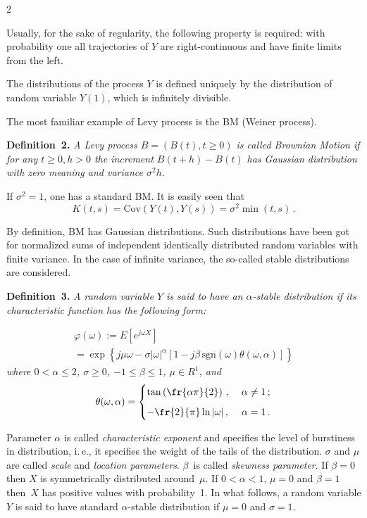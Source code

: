 \begin{multicols}{2}
\smallskip

Usually, for the sake of regularity,  the following property is required: with 
probability one all trajectories of $Y$ are right-continuous and have finite limits 
from the left. 

The distributions of the process $Y$ is defined uniquely by the distribution of 
random variable $Y(1)$, which is infinitely divisible. 

The most familiar example of Levy process is the BM (Weiner process). 

\smallskip

\noindent
\textbf{Definition~2.} 
\textit{A Levy process $B = (B(t), t\geq 0)$ is called Brownian Motion if for any 
$t\geq 0, h>0$ the increment 
$B(t+h) -B(t)$ has Gaussian distribution with zero meaning and variance $\sigma^2 h$}. 

\smallskip

If $\sigma^2 =1$,  one has a standard BM. It is easily seen that 
$$
K(t,s) = \mbox{Cov} \left(Y(t), Y(s)\right) = \sigma^2 \min (t,s) \, . 
$$

By definition, BM has Gaussian distributions. Such distributions have been got for normalized 
sums of independent identically distributed random variables with finite variance. 
In the case of 
infinite variance,  the so-called stable distributions are considered. 

\smallskip

\noindent
\textbf{Definition~3.} 
\textit{A random variable $Y$ is said to have an $\alpha$-stable distribution if its 
characteristic function has the following form:} 

\noindent
\begin{multline*}
\varphi (\omega ) := E\left[ e^{j\omega X} \right] \\
{}=
\exp \left\{ j\mu\omega - \sigma |\omega |^{\alpha} [1 - j \beta\, \mbox{sgn}\left(\omega \right) 
\theta (\omega , \alpha )] \right\}  
\end{multline*}
\textit{where $0< \alpha \leq 2$, $\sigma\geq 0$, $-1 \leq \beta \leq 1$, $\mu\in R^1$, and} 
$$
\theta (\omega , \alpha ) = 
\begin{cases}
\tan \left( \fr{\alpha \pi }{2} \right)\,, &\ \alpha \not= 1\,; \\[6pt]
-\fr{2}{\pi} \ln |\omega |\,,  &\ \alpha =1\,. 
\end{cases}
$$


\smallskip

Parameter $\alpha$ is called {\it characteristic exponent} and specifies the level of 
burstiness in distribution, i.\,e., it specifies the weight of the tails of the distribution. 
$\sigma$ and $\mu$ are called {\it scale} and {\it location parameters}. 
$\beta$~is called {\it skewness parameter}. If $\beta =0$ then $X$ is symmetrically 
distributed around~$\mu$. If $0<\alpha <1$, $\mu =0$ and $\beta =1$ then~$X$ 
has positive 
values with probability~1. In what follows, a random variable $Y$ is said to have  standard 
$\alpha$-stable distribution if $\mu =0$ and $\sigma = 1$. 


\end{multicols}
